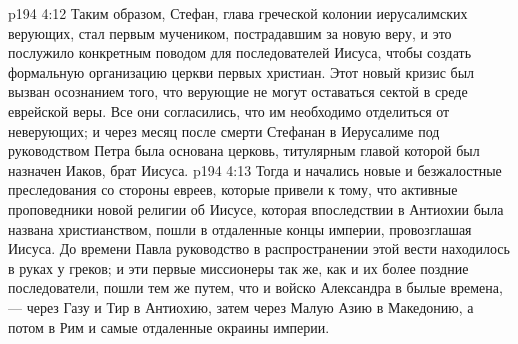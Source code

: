 \vs p194 4:12 Таким образом, Стефан, глава греческой колонии иерусалимских верующих, стал первым мучеником, пострадавшим за новую веру, и это послужило конкретным поводом для последователей Иисуса, чтобы создать формальную организацию церкви первых христиан. Этот новый кризис был вызван осознанием того, что верующие не могут оставаться сектой в среде еврейской веры. Все они согласились, что им необходимо отделиться от неверующих; и через месяц после смерти Стефанан в Иерусалиме под руководством Петра была основана церковь, титулярным главой которой был назначен Иаков, брат Иисуса.
\vs p194 4:13 Тогда и начались новые и безжалостные преследования со стороны евреев, которые привели к тому, что активные проповедники новой религии об Иисусе, которая впоследствии в Антиохии была названа христианством, пошли в отдаленные концы империи, провозглашая Иисуса. До времени Павла руководство в распространении этой вести находилось в руках у греков; и эти первые миссионеры так же, как и их более поздние последователи, пошли тем же путем, что и войско Александра в былые времена, --- через Газу и Тир в Антиохию, затем через Малую Азию в Македонию, а потом в Рим и самые отдаленные окраины империи.
